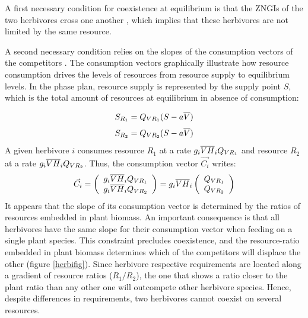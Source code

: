 \documentclass[12pt]{article}
\newcommand\barre[1]{\overline{\rule{0pt}{1.5ex}#1}}
\begin{document}
A first necessary condition for coexistence at equilibrium is that the ZNGIs of the two herbivores cross one another \citep{Tilman1982}, which implies that these herbivores are not limited by the same resource. 
\par
A second necessary condition relies on the slopes of the consumption vectors of the competitors %
\citep{Tilman1982}.  The consumption vectors graphically illustrate how resource consumption drives the levels of resources from resource supply to equilibrium levels. In the phase plan, resource supply is represented by the supply point $S$, which is the total amount of resources at equilibrium in absence of consumption:

\begin{equation}
S_{R_1}=Q_{VR_1}(S-a\barre{V})
\end{equation}
\begin{equation}
S_{R_2}=Q_{VR_2}(S-a\barre{V})
\end{equation}
A given herbivore $i$ consumes resource $R_1$ at a rate $g_i\barre{V}\barre{H}_i Q_{VR_1}$ and resource $R_2$ at a rate $g_i\barre{V}\barre{H}_i Q_{VR_2}$. Thus, 
the consumption vector $\vec{C_i}$ writes: 
\begin{equation}
\vec{C_i}=\left( 
\begin{array}{l}
g_i\barre{V}\barre{H}_i Q_{VR_1}\\
g_i\barre{V}\barre{H}_i Q_{VR_2}
\end{array}\right) 
=g_i\barre{V}\barre{H}_i \left( 
\begin{array}{l}
Q_{VR_1}\\
Q_{VR_2}
\end{array}\right) 
\end{equation}
It appears that the slope of its consumption vector is determined by the ratios of resources embedded in plant biomass. An important consequence is that all herbivores have the same slope for their consumption vector when feeding on a single plant species. This constraint precludes coexistence, and the resource-ratio embedded in plant biomass determines which of the competitors will displace the other (figure \ref{herbifig}). %
Since herbivore respective requirements are located along a gradient of resource ratios ($R_1 / R_2$), the one that shows a ratio closer to the plant ratio than any other one will outcompete other herbivore species. Hence, despite differences in requirements, two herbivores cannot coexist on several resources.  %
\end{document}

